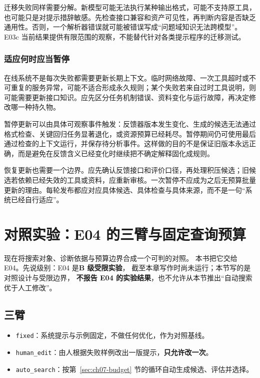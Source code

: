 迁移失败同样需要分解。新模型可能无法执行某种输出格式，可能不支持原工具，也可能只是对提示措辞敏感。先检查接口兼容和资产可见性，再判断内容是否缺乏通用性。否则，一个解析器错误就可能被错误写成“问题域知识无法跨模型”。E03c 当前结果提供有限范围的观察，不能替代针对各类提示程序的迁移测试。

\subsubsection{适应何时应当暂停}

在线系统不是每次失败都需要更新长期上下文。临时网络故障、一次工具超时或不可重复的服务异常，可能不适合形成永久规则；某个失败若来自过时工具说明，则可能需要更新接口知识。应先区分任务机制错误、资料变化与运行故障，再决定修改哪一种持久物。

暂停更新可以由具体可观察事件触发：反馈器版本发生变化、生成的候选无法通过格式检查、关键回归任务显著退化，或资源预算已经耗尽。暂停期间仍可使用最后通过检查的上下文运行，并保存待分析事件。这样做的目的不是保证旧版本永远正确，而是避免在反馈含义已经变化时继续把不确定解释固化成规则。

恢复更新也需要一个边界。应先确认反馈接口和评价口径，再处理积压候选；旧候选若依赖已经失效的工具或资料，应重新审核。一次暂停不应成为之后无预算批量更新的理由。每轮发布都应对应具体候选、具体检查与具体来源，而不是一句“系统已经自行适应”。

\section{对照实验：E04 的三臂与固定查询预算}
\label{sec:ch07-e04}

现在将搜索对象、诊断依据与预算边界合成一个可判的对照。
本书把它交给 E04。先说级别：E04 是\textbf{B 级受限实验}，
截至本章写作时尚未运行；本节写的是对照设计与受限边界，
\textbf{不报告 E04 的实验结果}，也不允许从本节推出“自动搜索优于人工修改”。

\subsection*{三臂}

\begin{itemize}
\sloppy
  \item \texttt{fixed}：系统提示与示例固定，不做任何优化，作为对照基线。
  \item \texttt{human\_edit}：由人根据失败样例改出一版提示，\textbf{只允许改一次}。
  \item \texttt{auto\_search}：按第~\ref{sec:ch07-budget} 节的循环自动生成候选、评估并选择。
\end{itemize}

